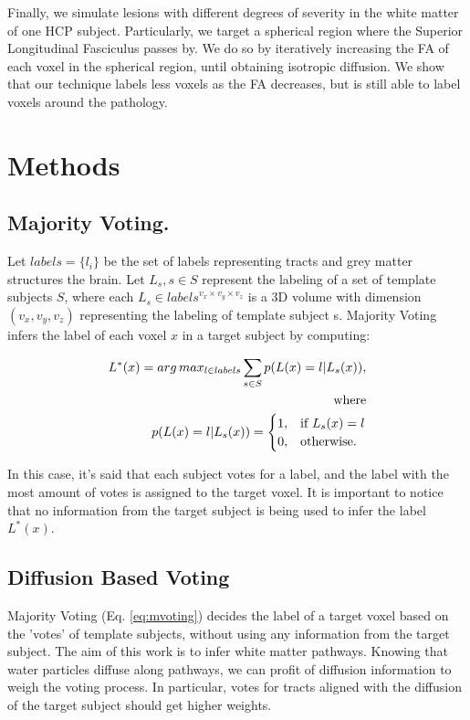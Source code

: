 Finally, we simulate lesions with different degrees of severity in the white
matter of one HCP subject. Particularly, we target a spherical region where
the Superior Longitudinal Fasciculus passes by. We do so by iteratively increasing
the FA of each voxel in the spherical region, until obtaining isotropic diffusion.
We show that our technique labels less voxels as the FA decreases, but is still
able to label voxels around the pathology. 

\section{Methods}
\label{sec:methods}

\subsection{Majority Voting.}
Let $labels = \{l_i\}$ be the set of labels representing tracts and grey matter
structures the brain. Let ${L_s}, s\in S$ represent the labeling of a set of
template subjects $S$, where each $L_s \in labels^{v_x\times v_y \times v_z}$ is
a 3D volume with dimension $(v_x,v_y,v_z)$ representing the labeling of template
subject s. Majority Voting~\cite{Rohlfing2004} infers the label of
each voxel $x$ in a target subject by computing:

\begin{equation}
\label{eq:mvoting}
\begin{aligned}
    L^*(x) = arg\,max_{l \in labels} \sum_{s\in S} p(L(x) = l | L_s(x)),\\
    \text{where} \\
    p(L(x) = l | L_s(x)) =
    \begin{cases}
        1,& \text{if } L_s(x) = l \\
        0,& \text{otherwise.}
    \end{cases}
\end{aligned}
\end{equation}

In this case, it's said that each subject votes for a label, and the label with
the most amount of votes is assigned to the target voxel. It is important to
notice that no information from the target subject is being used to infer the
label $L^*(x)$.

\subsection{Diffusion Based Voting}
Majority Voting (Eq. \ref{eq:mvoting}) decides the label of a target voxel based
on the 'votes' of template subjects, without using any information from the
target subject. The aim of this work is to infer white matter pathways. Knowing
that water particles diffuse along pathways, we can profit of diffusion information
to weigh the voting process. In particular, votes for tracts aligned with the
diffusion of the target subject should get higher weights.

